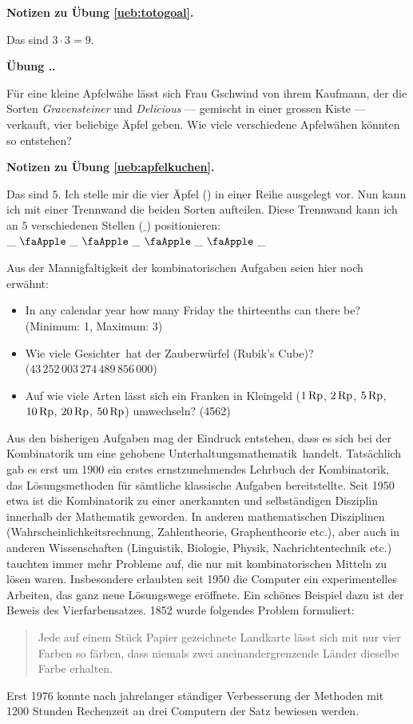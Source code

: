 \documentclass[%
11pt,%
twoside,%
titlepage,%
german,%
headsepline%
]{scrartcl}
\newcommand{\faEyeLightGray}{\textcolor{lightgray}{\faEye}} %
\newcounter{theo}[section]\setcounter{theo}{0}
\newcommand{\concatueb}[1]{ueb:#1}%
\newcommand{\concatlsg}[1]{lsg:#1}%
\newcounter{uebcounter}[section]
\renewcommand{\theuebcounter}{\thesection.\arabic{uebcounter}}  %
\newenvironment{lsg}[1]{%
    \par\noindent\textbf{Notizen zu Übung \ref{\concatueb{#1}}.}%
    \label{\concatlsg{#1}}
}{%
    \par%
}
\newenvironment{uebenv}[1]{%
    \refstepcounter{uebcounter}
    \par\noindent\textbf{Übung \theuebcounter.}%
    \label{\concatueb{#1}}\hfill\hyperref[\concatlsg{#1}]{\faEyeLightGray}\par
}{%
    \par
}
\begin{document}
\begin{lsg}{totogoal}
Das sind $3\cdot3=9$.
\end{lsg}


\begin{uebenv}{apfelkuchen}
 Für eine kleine Apfelwähe lässt sich Frau Gschwind von ihrem Kaufmann, der die Sorten \emph{Gravensteiner} und \emph{Delicious} --- gemischt in einer grossen Kiste --- verkauft, vier beliebige Äpfel geben. Wie viele verschiedene Apfelwähen könnten so entstehen?
 \end{uebenv}

\begin{lsg}{apfelkuchen}
Das sind $5$. Ich stelle mir die vier \"Apfel (\faApple) in einer Reihe ausgelegt vor. Nun kann ich mit einer Trennwand die beiden Sorten aufteilen. Diese Trennwand kann ich an $5$ verschiedenen Stellen ($\_$) positionieren:
$\_\ \text{\faApple}\ \_\ \text{\faApple}\ \_\ \text{\faApple}\ \_\ \text{\faApple}\ \_$
\end{lsg}
  
 Aus der Mannigfaltigkeit der kombinatorischen Aufgaben seien hier noch erwähnt:
 \begin{itemize}
 \item In any calendar year how many Friday the thirteenths can there be? (Minimum: 1, Maximum: 3)
 \item Wie viele \glqq Gesichter\grqq\ hat der Zauberwürfel (Rubik's Cube)?\\ ($43\,252\,003\,274\,489\,856\,000$)
 \item Auf wie viele Arten lässt sich ein Franken in Kleingeld ($\unit[1]{Rp}$, $\unit[2]{Rp}$, $\unit[5]{Rp}$, $\unit[10]{Rp}$, $\unit[20]{Rp}$, $\unit[50]{Rp}$) umwechseln? (4562)
 \end{itemize}
 
 Aus den bisherigen Aufgaben mag der Eindruck entstehen, dass es sich bei der Kombinatorik um eine \glqq gehobene Unterhaltungsmathematik\grqq\ handelt. Tatsächlich gab es erst um 1900 ein erstes ernstzunehmendes Lehrbuch der Kombinatorik, das Lösungsmethoden für sämtliche klassische Aufgaben bereitstellte. Seit 1950 etwa ist die Kombinatorik zu einer anerkannten und selbständigen Disziplin innerhalb der Mathematik geworden. In anderen mathematischen Disziplinen (Wahrscheinlichkeitsrechnung, Zahlentheorie, Graphentheorie etc.), aber auch in anderen Wissenschaften (Linguistik, Biologie, Physik, Nachrichtentechnik etc.) tauchten immer mehr Probleme auf, die nur mit kombinatorischen Mitteln zu lösen waren. Insbesondere erlaubten seit 1950 die Computer ein experimentelles Arbeiten, das ganz neue Lösungswege eröffnete. Ein schönes Beispiel dazu ist der Beweis des Vierfarbensatzes. 1852 wurde folgendes Problem formuliert:
 \begin{quote}
Jede auf einem Stück Papier gezeichnete Landkarte lässt sich mit nur vier Farben so färben, dass niemals zwei aneinandergrenzende Länder dieselbe Farbe erhalten.
 \end{quote}
Erst 1976 konnte nach jahrelanger ständiger Verbesserung der Methoden mit 1200 Stunden Rechenzeit an drei Computern der Satz bewiesen werden.
\end{document}
